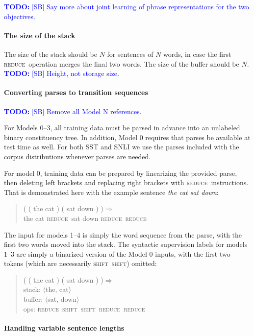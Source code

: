 \documentclass[11pt]{article}
\newcommand\todo[1]{\textcolor{blue}{\textbf{TODO:} #1}}
\newcommand{\shift}{\textsc{shift}}
\newcommand{\reduce}{\textsc{reduce}}
\def\ii#1{\textit{#1}}
\begin{document}
\todo{[SB] Say more about joint learning of phrase representations for the two objectives.}

\paragraph{The size of the stack}
The size of the stack should be $N$ for sentences of $N$ words, in case the first \reduce~operation merges the final two words. The size of the buffer should be $N$. \todo{[SB] Height, not storage size.}

\paragraph{Converting parses to transition sequences}
\todo{[SB] Remove all Model N references.}

For Models 0--3, all training data must be parsed in advance into an unlabeled binary constituency tree. In addition, Model 0 requires that  parses be available at test time as well. For both SST and SNLI we use the parses included with the corpus distributions whenever parses are needed. 

For model 0, training data can be prepared by linearizing the provided parse, then deleting left brackets and replacing right brackets with \reduce~instructions. That is demonstrated here with the example sentence \ii{the cat sat down}:

\begin{quote}\small
( ( the cat ) ( sat down ) )$\Rightarrow$\\
the cat \reduce~sat down \reduce~\reduce
\end{quote}

The input for models 1--4 is simply the word sequence from the parse, with the first two words moved into the stack. The syntactic supervision labels for models 1--3 are simply a binarized version of the Model 0 inputs, with the first two tokens (which are necessarily \shift~\shift) omitted: 

\begin{quote}\small
( ( the cat ) ( sat down ) )$\Rightarrow$ \\
stack: $\langle$the, cat$\rangle$\\
buffer: $\langle$sat, down$\rangle$\\
ops: \reduce~\shift~\shift~\reduce~\reduce
\end{quote}

\paragraph{Handling variable sentence lengths}
\end{document}
